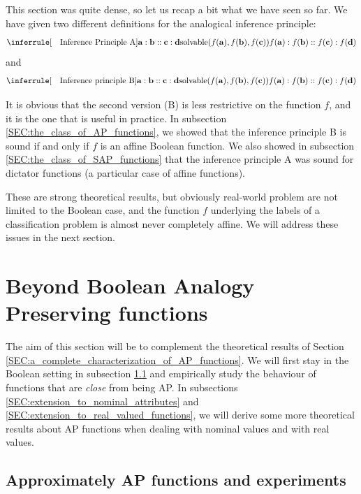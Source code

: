 This section was quite dense, so let us recap a bit what we have seen so far.
We have given two different definitions for the analogical inference principle:
$$
\inferrule[\text{~~ Inference Principle A}]{\mathbf{a} : \mathbf{b} ::
\mathbf{c} : \mathbf{d}}{\solvable(f(\mathbf{a}), f(\mathbf{b}),
f(\mathbf{c}))\\\\ f(\mathbf{a}) : f(\mathbf{b}) :: f(\mathbf{c}) :
f(\mathbf{d}) } $$
and
$$
\inferrule[\text{~~ Inference principle B}]{\mathbf{a} : \mathbf{b} ::
\mathbf{c} : \mathbf{d} \\\\ \solvable(f(\mathbf{a}), f(\mathbf{b}),
f(\mathbf{c}))}{f(\mathbf{a}) : f(\mathbf{b}) :: f(\mathbf{c}) : f(\mathbf{d})}
$$

It is obvious that the second version (B) is less restrictive on the function
$f$, and it is the one that is useful in practice. In subsection
\ref{SEC:the_class_of_AP_functions}, we showed that the inference principle B
is sound if and only if $f$ is an affine Boolean function. We also showed in
subsection \ref{SEC:the_class_of_SAP_functions} that the inference principle A
was sound for dictator functions (a particular case of affine functions).

These are strong theoretical results, but obviously real-world problem are not
limited to the Boolean case, and the function $f$ underlying the labels of a
classification problem is almost never completely affine. We will address these
issues in the next section.

\section{Beyond Boolean Analogy Preserving functions}
\label{SEC:beyond_boolean_AP_functions}

The aim of this section will be to complement the theoretical results of
Section \ref{SEC:a_complete_characterization_of_AP_functions}. We will first
stay in the Boolean setting in subsection \ref{SEC:approximate_ap_functions}
and empirically study the behaviour of functions that  are \textit{close} from
being AP. In subsections \ref{SEC:extension_to_nominal_attributes} and
\ref{SEC:extension_to_real_valued_functions}, we will derive some more
theoretical results about AP functions when dealing with nominal values and
with real values.

\subsection{Approximately AP functions and experiments}
\label{SEC:approximate_ap_functions}

